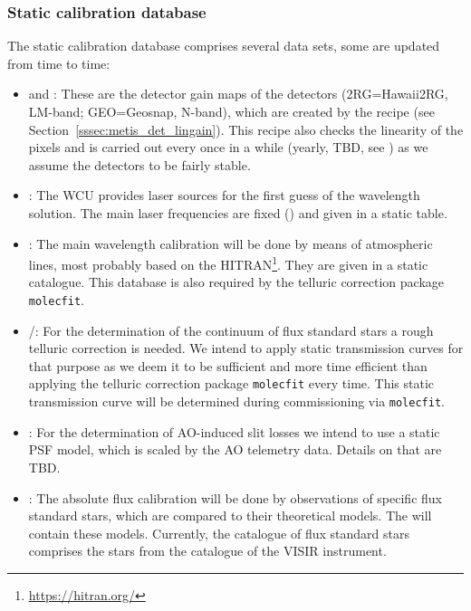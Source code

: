 \subsubsection{Static calibration database}\label{lss:static_calib}
The static calibration database comprises several data sets, some are updated from time to time:
\begin{itemize}
    \item \hyperref[dataitem:gain_map_lm]{} and \hyperref[dataitem:gain_map_n]{}: These are the detector gain maps of the detectors (2RG=Hawaii2RG, LM-band; GEO=Geosnap, N-band), which are created by the recipe \hyperref[sssec:metis_det_lingain]{} (see Section~\ref{sssec:metis_det_lingain}). This recipe also checks the linearity of the pixels and is carried out every once in a while (yearly, TBD, see \cite{METIS-calibration_plan}) as we assume the detectors to be fairly stable.
    \item \hyperref[dataitem:laser_tab]{}: The \ac{WCU} provides laser sources for the first guess of the wavelength solution. The main laser frequencies are fixed (\cite{METIS-calibration_plan}) and given in a static table.
    \item \hyperref[dataitem:atm_line_cat]{}: The main wavelength calibration will be done by means of atmospheric lines, most probably based on the \ac{HITRAN}\footnote{\url{https://hitran.org/}}. They are given in a static catalogue. This database is also required by the telluric correction package \texttt{molecfit}.
    \item \hyperref[dataitem:lm_synth_trans]{}/\hyperref[dataitem:n_synth_trans]{}: For the determination of the continuum of flux standard stars a rough telluric correction is needed. We intend to apply static transmission curves for that purpose as we deem it to be sufficient and more time efficient than applying the telluric correction package \texttt{molecfit} every time. This static transmission curve will be determined during commissioning via \texttt{molecfit}.
    \item \hyperref[dataitem:ao_psf_model]{}: For the determination of \ac{AO}-induced slit losses we intend to use a static \ac{PSF} model, which is scaled by the \ac{AO} telemetry data. Details on that are TBD.
    \item \hyperref[dataitem:ref_flux_cat]{}: The absolute flux calibration will be done by observations of specific flux standard stars, which are compared to their theoretical models. The \hyperref[dataitem:ref_flux_cat]{} will contain these models. Currently, the catalogue of flux standard stars comprises the stars from the catalogue of the \ac{VISIR} instrument.

\end{itemize}
